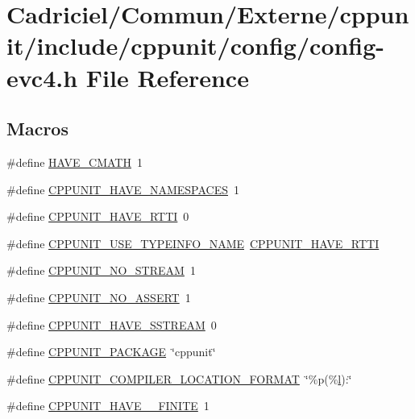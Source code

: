 \hypertarget{config-evc4_8h}{\section{Cadriciel/\-Commun/\-Externe/cppunit/include/cppunit/config/config-\/evc4.h File Reference}
\label{config-evc4_8h}
}
\subsection*{Macros}
\begin{DoxyCompactItemize}
\item 
\#define \hyperlink{config-evc4_8h_a5ebdfdabf36598943dc9faa5699a1ba5}{H\-A\-V\-E\-\_\-\-C\-M\-A\-T\-H}~1
\item 
\#define \hyperlink{config-evc4_8h_a3ab513bf42c44fb8ea41bd9e91249975}{C\-P\-P\-U\-N\-I\-T\-\_\-\-H\-A\-V\-E\-\_\-\-N\-A\-M\-E\-S\-P\-A\-C\-E\-S}~1
\item 
\#define \hyperlink{config-evc4_8h_aa57c801a8aa25a44f91b88435ebdfc99}{C\-P\-P\-U\-N\-I\-T\-\_\-\-H\-A\-V\-E\-\_\-\-R\-T\-T\-I}~0
\item 
\#define \hyperlink{config-evc4_8h_a40c5e2a5f158770c99264e4a3e76c7c7}{C\-P\-P\-U\-N\-I\-T\-\_\-\-U\-S\-E\-\_\-\-T\-Y\-P\-E\-I\-N\-F\-O\-\_\-\-N\-A\-M\-E}~\hyperlink{config-msvc6_8h_aa57c801a8aa25a44f91b88435ebdfc99}{C\-P\-P\-U\-N\-I\-T\-\_\-\-H\-A\-V\-E\-\_\-\-R\-T\-T\-I}
\item 
\#define \hyperlink{config-evc4_8h_a86bc5639ceedfa42c6af8cf1dc51b724}{C\-P\-P\-U\-N\-I\-T\-\_\-\-N\-O\-\_\-\-S\-T\-R\-E\-A\-M}~1
\item 
\#define \hyperlink{config-evc4_8h_afb9cb3b2188c6fe38ef8dffd9eaa0355}{C\-P\-P\-U\-N\-I\-T\-\_\-\-N\-O\-\_\-\-A\-S\-S\-E\-R\-T}~1
\item 
\#define \hyperlink{config-evc4_8h_abfac7981ab6ff3283d18d6f843060012}{C\-P\-P\-U\-N\-I\-T\-\_\-\-H\-A\-V\-E\-\_\-\-S\-S\-T\-R\-E\-A\-M}~0
\item 
\#define \hyperlink{config-evc4_8h_ab061dbee09290b54646174466eff2e73}{C\-P\-P\-U\-N\-I\-T\-\_\-\-P\-A\-C\-K\-A\-G\-E}~\char`\"{}cppunit\char`\"{}
\item 
\#define \hyperlink{config-evc4_8h_a17c58ff0a5526dbcd28ebe3af5e7f04d}{C\-P\-P\-U\-N\-I\-T\-\_\-\-C\-O\-M\-P\-I\-L\-E\-R\-\_\-\-L\-O\-C\-A\-T\-I\-O\-N\-\_\-\-F\-O\-R\-M\-A\-T}~\char`\"{}\%p(\%\hyperlink{glew_8h_ad0c4520fe2189faca59157f84ef690f9}{l})\-:\char`\"{}
\item 
\#define \hyperlink{config-evc4_8h_ae452bc2f11857a9c8a6b713f4f5fee3e}{C\-P\-P\-U\-N\-I\-T\-\_\-\-H\-A\-V\-E\-\_\-\-\_\-\-F\-I\-N\-I\-T\-E}~1
\end{DoxyCompactItemize}


